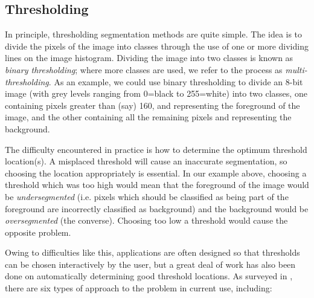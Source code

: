 \subsection{Thresholding}



In principle, thresholding segmentation methods are quite simple. The idea is to divide the pixels of the image into classes through the use of one or more dividing lines on the image histogram. Dividing the image into two classes is known as \emph{binary thresholding}; where more classes are used, we refer to the process as \emph{multi-thresholding}. As an example, we could use binary thresholding to divide an 8-bit image (with grey levels ranging from 0=black to 255=white) into two classes, one containing pixels greater than (say) 160, and representing the foreground of the image, and the other containing all the remaining pixels and representing the background.

The difficulty encountered in practice is how to determine the optimum threshold location(s). A misplaced threshold will cause an inaccurate segmentation, so choosing the location appropriately is essential. In our example above, choosing a threshold which was too high would mean that the foreground of the image would be \emph{undersegmented} (i.e. pixels which should be classified as being part of the foreground are incorrectly classified as background) and the background would be \emph{oversegmented} (the converse). Choosing too low a threshold would cause the opposite problem.

Owing to difficulties like this, applications are often designed so that thresholds can be chosen interactively by the user, but a great deal of work has also been done on automatically determining good threshold locations. As surveyed in \cite{sezgin04}, there are six types of approach to the problem in current use, including:

